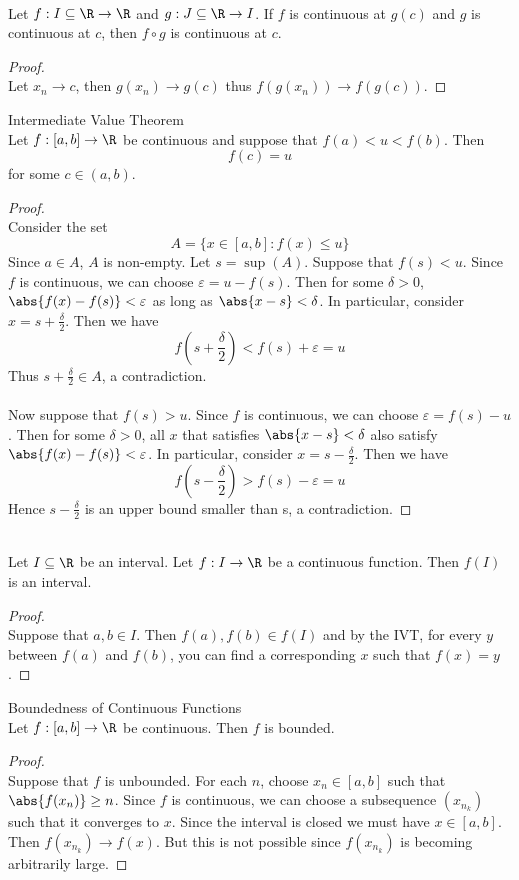\documentclass[a4paper]{article}
\begin{document}
\begin{prp}{}{}\\ Let $f:I\subseteq\R\to\R$ and $g:J\subseteq\R\to I$. If $f$ is continuous at $g(c)$ and $g$ is continuous at $c$, then $f\circ g$ is continuous at $c$. 
\begin{proof}\\ Let $x_n\to c$, then $g(x_n)\to g(c)$ thus $f(g(x_n))\to f(g(c))$. 
\end{proof}
\end{prp}

\begin{thm}{Intermediate Value Theorem}{}\\ Let $f:[a,b]\to\R$ be continuous and suppose that $f(a)<u<f(b)$. Then $$f(c)=u$$ for some $c\in(a,b)$.
\begin{proof}\\ Consider the set $$A=\{x\in[a,b]:f(x)\leq u\}$$ Since $a\in A$, $A$ is non-empty. Let $s=\sup(A)$. Suppose that $f(s)<u$. Since $f$ is continuous, we can choose $\varepsilon=u-f(s)$. Then for some $\delta>0$, $\abs{f(x)-f(s)}<\varepsilon$ as long as $\abs{x-s}<\delta$. In particular, consider $x=s+\frac{\delta}{2}$. Then we have $$f\left(s+\frac{\delta}{2}\right)<f(s)+\varepsilon=u$$ Thus $s+\frac{\delta}{2}\in A$, a contradiction. \\~\\
Now suppose that $f(s)>u$. Since $f$ is continuous, we can choose $\varepsilon=f(s)-u$. Then for some $\delta>0$, all $x$ that satisfies $\abs{x-s}<\delta$ also satisfy $\abs{f(x)-f(s)}<\varepsilon$. In particular, consider $x=s-\frac{\delta}{2}$. Then we have $$f\left(s-\frac{\delta}{2}\right)>f(s)-\varepsilon=u$$ Hence $s-\frac{\delta}{2}$ is an upper bound smaller than s, a contradiction. 
\end{proof}
\end{thm}

\begin{crl}{}{}\\
Let $I\subseteq\R$ be an interval. Let $f:I\to\R$ be a continuous function. Then $f(I)$ is an interval. 
\begin{proof}\\ Suppose that $a,b\in I$. Then $f(a),f(b)\in f(I)$ and by the IVT, for every $y$ between $f(a)$ and $f(b)$, you can find a corresponding $x$ such that $f(x)=y$. 
\end{proof}
\end{crl}

\begin{thm}{Boundedness of Continuous Functions}{}\\ Let $f:[a,b]\to\R$ be continuous. Then $f$ is bounded. 
\begin{proof}\\ Suppose that $f$ is unbounded. For each $n$, choose $x_n\in[a,b]$ such that $\abs{f(x_n)}\geq n$. Since $f$ is continuous, we can choose a subsequence $(x_{n_k})$ such that it converges to $x$. Since the interval is closed we must have $x\in[a,b]$. Then $f(x_{n_k})\to f(x)$. But this is not possible since $f(x_{n_k})$ is becoming arbitrarily large. 
\end{proof}
\end{thm}
\end{document}
